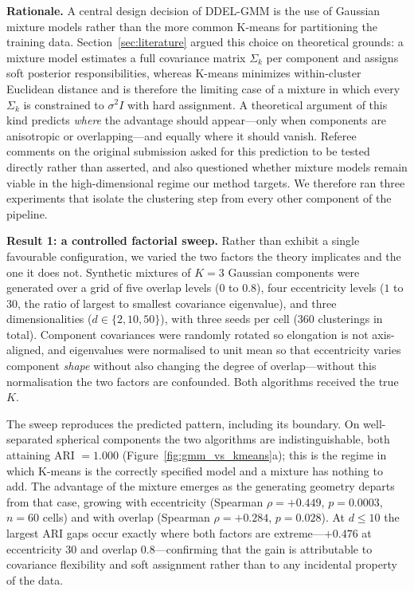 \documentclass[lettersize,journal]{IEEEtran}
\begin{document}
		\noindent \textbf{Rationale.} A central design decision of DDEL-GMM is the use of Gaussian mixture models rather than the more common K-means for partitioning the training data. Section~\ref{sec:literature} argued this choice on theoretical grounds: a mixture model estimates a full covariance matrix $\Sigma_k$ per component and assigns soft posterior responsibilities, whereas K-means minimizes within-cluster Euclidean distance and is therefore the limiting case of a mixture in which every $\Sigma_k$ is constrained to $\sigma^2 I$ with hard assignment. A theoretical argument of this kind predicts \emph{where} the advantage should appear---only when components are anisotropic or overlapping---and equally where it should vanish. Referee comments on the original submission asked for this prediction to be tested directly rather than asserted, and also questioned whether mixture models remain viable in the high-dimensional regime our method targets. We therefore ran three experiments that isolate the clustering step from every other component of the pipeline.
		
		\noindent \textbf{Result 1: a controlled factorial sweep.} Rather than exhibit a single favourable configuration, we varied the two factors the theory implicates and the one it does not. Synthetic mixtures of $K=3$ Gaussian components were generated over a grid of five overlap levels ($0$ to $0.8$), four eccentricity levels ($1$ to $30$, the ratio of largest to smallest covariance eigenvalue), and three dimensionalities ($d \in \{2,10,50\}$), with three seeds per cell ($360$ clusterings in total). Component covariances were randomly rotated so elongation is not axis-aligned, and eigenvalues were normalised to unit mean so that eccentricity varies component \emph{shape} without also changing the degree of overlap---without this normalisation the two factors are confounded. Both algorithms received the true $K$.
		
		\noindent The sweep reproduces the predicted pattern, including its boundary. On well-separated spherical components the two algorithms are indistinguishable, both attaining ARI $= 1.000$ (Figure~\ref{fig:gmm_vs_kmeans}a); this is the regime in which K-means is the correctly specified model and a mixture has nothing to add. The advantage of the mixture emerges as the generating geometry departs from that case, growing with eccentricity (Spearman $\rho = +0.449$, $p = 0.0003$, $n = 60$ cells) and with overlap (Spearman $\rho = +0.284$, $p = 0.028$). At $d \leq 10$ the largest ARI gaps occur exactly where both factors are extreme---$+0.476$ at eccentricity $30$ and overlap $0.8$---confirming that the gain is attributable to covariance flexibility and soft assignment rather than to any incidental property of the data.
		
\end{document}
